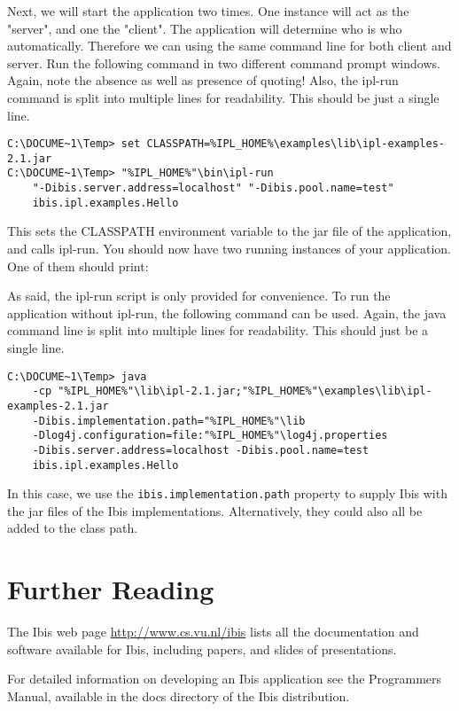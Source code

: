 \documentclass[a4paper,10pt]{article}
\begin{document}
Next, we will start the application two times. One instance will act as the
"server", and one the "client". The application will determine who is who
automatically. Therefore we can using the same command line for both client 
and server. Run the following command in two different command prompt windows.
Again, note the absence as well as presence of quoting! Also, the ipl-run
command is split into multiple lines for readability. This should be just a single
line.

\noindent
{\small
\begin{verbatim}
C:\DOCUME~1\Temp> set CLASSPATH=%IPL_HOME%\examples\lib\ipl-examples-2.1.jar
C:\DOCUME~1\Temp> "%IPL_HOME%"\bin\ipl-run
    "-Dibis.server.address=localhost" "-Dibis.pool.name=test"
    ibis.ipl.examples.Hello
\end{verbatim}
}
\noindent

This sets the CLASSPATH environment variable to the jar file of the
application, and calls ipl-run. You should now have two running
instances of your application. One of them should print:

 \noindent 

As said, the ipl-run script is only provided for convenience. To run
the application without ipl-run, the following command can be used.
Again, the java command line is split into multiple lines for readability.
This should just be a single line.

\noindent
{\small
\begin{verbatim}
C:\DOCUME~1\Temp> java
    -cp "%IPL_HOME%"\lib\ipl-2.1.jar;"%IPL_HOME%"\examples\lib\ipl-examples-2.1.jar
    -Dibis.implementation.path="%IPL_HOME%"\lib
    -Dlog4j.configuration=file:"%IPL_HOME%"\log4j.properties
    -Dibis.server.address=localhost -Dibis.pool.name=test
    ibis.ipl.examples.Hello
\end{verbatim}
}
\noindent

In this case, we use the \texttt{ibis.implementation.path} property to supply Ibis
with the jar files of the Ibis implementations. Alternatively, they
could also all be added to the class path.

\section{Further Reading}

The Ibis web page \url{http://www.cs.vu.nl/ibis} lists all
the documentation and software available for Ibis, including papers, and
slides of presentations.

For detailed information on developing an Ibis application see the
Programmers Manual, available in the docs directory of the Ibis
distribution.
\end{document}
